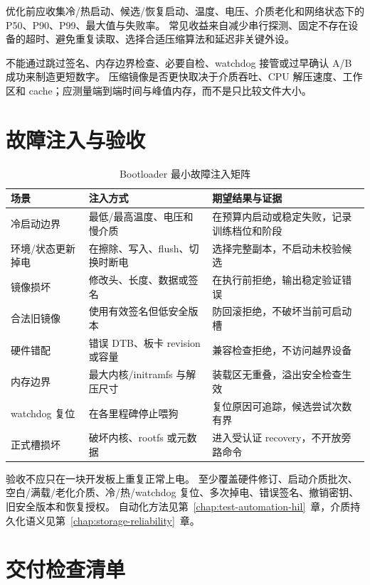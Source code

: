 优化前应收集冷/热启动、候选/恢复启动、温度、电压、介质老化和网络状态下的 P50、P90、P99、最大值与失败率。
常见收益来自减少串行探测、固定不存在设备的超时、避免重复读取、选择合适压缩算法和延迟非关键外设。

不能通过跳过签名、内存边界检查、必要自检、watchdog 接管或过早确认 A/B 成功来制造更短数字。
压缩镜像是否更快取决于介质吞吐、CPU 解压速度、工作区和 cache；应测量端到端时间与峰值内存，而不是只比较文件大小。

\section{故障注入与验收}

\begin{table}[H]
  \centering
  \caption{Bootloader 最小故障注入矩阵}
  \begin{tabular}{p{38mm}p{46mm}p{54mm}}
    \hline
    场景 & 注入方式 & 期望结果与证据 \\
    \hline
    冷启动边界 & 最低/最高温度、电压和慢介质 & 在预算内启动或稳定失败，记录训练档位和阶段 \\
    环境/状态更新掉电 & 在擦除、写入、flush、切换时断电 & 选择完整副本，不启动未校验候选 \\
    镜像损坏 & 修改头、长度、数据或签名 & 在执行前拒绝，输出稳定验证错误 \\
    合法旧镜像 & 使用有效签名但低安全版本 & 防回滚拒绝，不破坏当前可启动槽 \\
    硬件错配 & 错误 DTB、板卡 revision 或容量 & 兼容检查拒绝，不访问越界设备 \\
    内存边界 & 最大内核/initramfs 与解压尺寸 & 装载区无重叠，溢出安全检查生效 \\
    watchdog 复位 & 在各里程碑停止喂狗 & 复位原因可追踪，候选尝试次数有界 \\
    正式槽损坏 & 破坏内核、rootfs 或元数据 & 进入受认证 recovery，不开放旁路命令 \\
    \hline
  \end{tabular}
\end{table}

验收不应只在一块开发板上重复正常上电。
至少覆盖硬件修订、启动介质批次、空白/满载/老化介质、冷/热/watchdog 复位、多次掉电、错误签名、撤销密钥、旧安全版本和恢复授权。
自动化方法见第~\ref{chap:test-automation-hil}~章，介质持久化语义见第~\ref{chap:storage-reliability}~章。

\section{交付检查清单}

